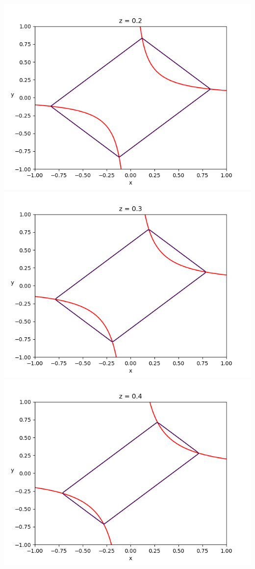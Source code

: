 \documentclass{article}
\begin{document}
\begin{enumerate}
\begin{center}
		\includegraphics[scale=.3]{hw7 level curves z = 0.2}
		\includegraphics[scale=.3]{hw7 level curves z = 0.3}
		\includegraphics[scale=.3]{hw7 level curves z = 0.4}
	\end{center}
	

\end{enumerate}
\end{document}
